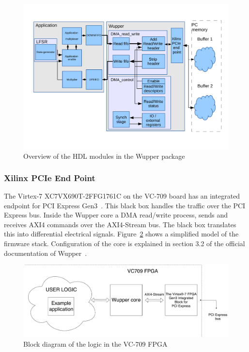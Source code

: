 \begin{figure}[h]
	\centering
	\includegraphics[width = 0.8 \textwidth]{figures/full_application_structure.pdf}	
	\caption{Overview of the HDL modules in the Wupper package}
	\label{fig:wupperpackage}
\end{figure}


\subsubsection {Xilinx PCIe End Point}


The Virtex-7 XC7VX690T-2FFG1761C on the VC-709 board has an integrated endpoint for PCI Express Gen3~\cite{pg023}. This black box handles the traffic over the PCI Express bus. Inside the Wupper core a DMA read/write process, sends and receives AXI4 commands over the AXI4-Stream bus. The black box translates this into differential electrical signals. Figure~\ref{fig:pciexpressendpoint} shows a simplified model of the firmware stack. Configuration of the core is explained in section 3.2 of the official documentation of Wupper~\cite{configpciecore}.

\begin{figure}[h]
	\centering
	\includegraphics[width = 1 \textwidth]{figures/PG023.pdf}	
	\caption{Block diagram of the logic in the VC-709 FPGA}
	\label{fig:pciexpressendpoint}
\end{figure}

